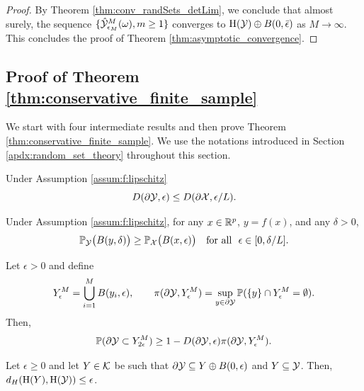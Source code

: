 \documentclass[12pt]{l4dc2022} %
\begin{document}
\begin{proof}
\vspace{2mm}

By Theorem \ref{thm:conv_randSets_detLim}, we conclude that almost surely, the sequence $\{\hat{\mathcal{Y}}^M_{\epsilon_M}(\omega),m\geq 1\}$  converges to $\textrm{H}(\mathcal{Y})\oplus B(0,\bar{\epsilon})$ as $M\rightarrow\infty$. 
This concludes the proof of Theorem \ref{thm:asymptotic_convergence}.
% 
% 
\end{proof}
% 










\subsection{Proof of Theorem \ref{thm:conservative_finite_sample}}\label{apdx:proof:thm:conservative_finite_sample}

We start with four intermediate results and then prove Theorem \ref{thm:conservative_finite_sample}. We use the notations introduced in Section \ref{apdx:random_set_theory} throughout this section.

% 


\begin{lemma}%
\label{lem:dX_packing_nb_Lip}
Under Assumption \ref{assum:f:lipschitz}  
$$D(\partial\mathcal{Y},\epsilon)\leq D(\partial\mathcal{X},\epsilon/L).$$ 
\end{lemma}



\begin{lemma}%
\label{lem:Xball_coverage_prob} Under Assumption \ref{assum:f:lipschitz}, for any $x\in\mathbb{R}^p$, 
$y=f(x)$, and 
any $\delta>0$, %
$$
\mathbb{P}_{\mathcal{Y}}\big(B(y,\delta)\big)
\geq \mathbb{P}_{\mathcal{X}}\big(B(x,\epsilon)\big)
\quad \text{for all }\ \epsilon\in [0,\delta/L].
$$
\end{lemma}
 
\begin{lemma}%
\label{lem:Xhulleps_conservative_geom}
Let $\epsilon>0$ and define 
$$
Y_\epsilon^M
=
\underset{i=1}{\overset{M}{\bigcup}} \,
B(y_i,\epsilon),
\qquad
\pi(\partial\mathcal{Y},Y_\epsilon^M)
=
\sup_{y\in\partial\mathcal{Y}}\mathbb{P}(\{y\} \cap Y_\epsilon^M = \emptyset).
$$  
% 
% 
% 
% 
% 
% 
Then, 
$$
\mathbb{P}(\partial\mathcal{Y}\subset Y_{2\epsilon}^M) \geq 1 - D(\partial\mathcal{Y},\epsilon)
\pi(\partial\mathcal{Y},Y_\epsilon^M).
$$
\end{lemma}

\begin{lemma}%
\label{lem:Hausdorff_hulls}
Let $\epsilon\geq 0$ and let $Y\in\mathcal{K}$ be such that    
% 
$\partial\mathcal{Y}\subseteq Y\oplus B(0,\epsilon)$ and $Y\subseteq \mathcal{Y}$. 
Then, $d_H(
\textrm{H}(Y), 
\textrm{H}(\mathcal{Y})
)\leq \epsilon$.
\end{lemma}
\end{document}
